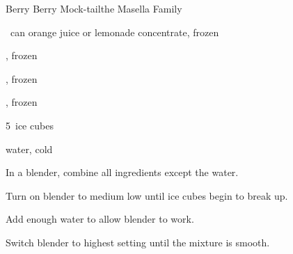 \begin{recipe}{Berry Berry Mock-tail}{the Masella Family}{}

\begin{ingredients}
\item \half~can orange juice or lemonade concentrate, frozen
\item \C{\half} , frozen
\item \C{\half} , frozen
\item \C{\half} , frozen
\item 5~ice cubes
\item water, cold
\end{ingredients}

\begin{directions}
\item In a blender, combine all ingredients except the water.
\item Turn on blender to medium low until ice cubes begin to break up.
\item Add enough water to allow blender to work.
\item Switch blender to highest setting until the mixture is smooth.
\end{directions}

\end{recipe}
